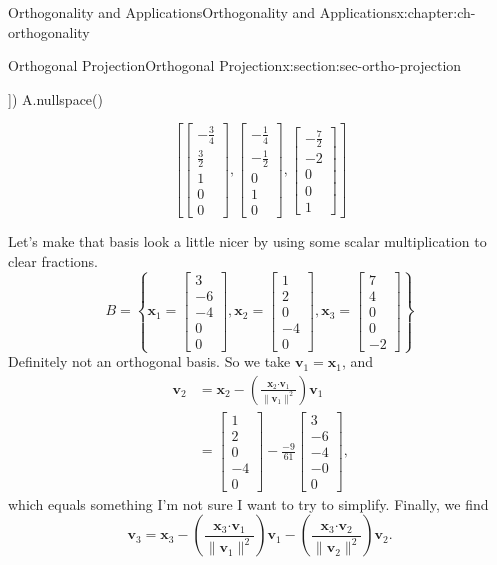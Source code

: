 \documentclass[oneside,10pt,]{book}
\numberwithin{equation}{section}
\newcommand{\bbm}{\begin{bmatrix}}
\newcommand{\ebm}{\end{bmatrix}}
\newcommand{\dotp}{\!\boldsymbol{\cdot}\!}
\newcommand{\len}[1]{\lVert #1\rVert}
\newcommand{\vv}{\mathbf{v}}
\newcommand{\xx}{\mathbf{x}}
\newcommand{\amp}{&}
\begin{document}
\begin{chapterptx}{Orthogonality and Applications}{}{Orthogonality and Applications}{}{}{x:chapter:ch-orthogonality}
\begin{sectionptx}{Orthogonal Projection}{}{Orthogonal Projection}{}{}{x:section:sec-ortho-projection}
\begin{sageinput}
            [2,1,0,1,9]])
A.nullspace()
\end{sageinput}
\begin{sageoutput}
\[\left[\bbm -\frac34\\ \frac32\\1\\0\\0\ebm, \bbm -\frac14\\ -\frac12\\0\\1\\0\ebm, \bbm -\frac72\\-2\\0\\0\\1\ebm\right]\]
\end{sageoutput}
Let's make that basis look a little nicer by using some scalar multiplication to clear fractions.%
\begin{equation*}
B=\left\{\xx_1=\bbm 3\\-6\\-4\\0\\0\ebm, \xx_2=\bbm 1\\2\\0\\-4\\0\ebm, \xx_3=\bbm 7\\4\\0\\0\\-2\ebm\right\}
\end{equation*}
Definitely not an orthogonal basis. So we take \(\vv_1=\xx_1\), and%
\begin{align*}
\vv_2 \amp = \xx_2-\left(\frac{\xx_2\dotp\vv_1}{\len{\vv_1}^2}\right)\vv_1\\
\amp = \bbm 1\\2\\0\\-4\\0\ebm -\frac{-9}{61}\bbm 3\\-6\\-4\\-0\\0\ebm \text{,}
\end{align*}
which equals something I'm not sure I want to try to simplify. Finally, we find%
\begin{equation*}
\vv_3 = \xx_3-\left(\frac{\xx_3\dotp \vv_1}{\len{\vv_1}^2}\right)\vv_1-\left(\frac{\xx_3\dotp\vv_2}{\len{\vv_2}^2}\right)\vv_2\text{.}
\end{equation*}

\end{sectionptx}
\end{chapterptx}
\end{document}
